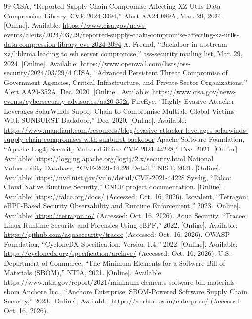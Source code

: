 \documentclass[conference]{IEEEtran}
\begin{document}
\begin{thebibliography}{99}
 CISA, ``Reported Supply Chain Compromise Affecting XZ Utils Data Compression Library, CVE-2024-3094,'' Alert AA24-089A, Mar. 29, 2024. [Online]. Available: \url{https://www.cisa.gov/news-events/alerts/2024/03/29/reported-supply-chain-compromise-affecting-xz-utils-data-compression-library-cve-2024-3094}
 A. Freund, ``Backdoor in upstream xz/liblzma leading to ssh server compromise,'' oss-security mailing list, Mar. 29, 2024. [Online]. Available: \url{https://www.openwall.com/lists/oss-security/2024/03/29/4}
 CISA, ``Advanced Persistent Threat Compromise of Government Agencies, Critical Infrastructure, and Private Sector Organizations,'' Alert AA20-352A, Dec. 2020. [Online]. Available: \url{https://www.cisa.gov/news-events/cybersecurity-advisories/aa20-352a}
 FireEye, ``Highly Evasive Attacker Leverages SolarWinds Supply Chain to Compromise Multiple Global Victims With SUNBURST Backdoor,'' Dec. 2020. [Online]. Available: \url{https://www.mandiant.com/resources/blog/evasive-attacker-leverages-solarwinds-supply-chain-compromises-with-sunburst-backdoor}
 Apache Software Foundation, ``Apache Log4j Security Vulnerabilities: CVE-2021-44228,'' Dec. 2021. [Online]. Available: \url{https://logging.apache.org/log4j/2.x/security.html}
 National Vulnerability Database, ``CVE-2021-44228 Detail,'' NIST, 2021. [Online]. Available: \url{https://nvd.nist.gov/vuln/detail/CVE-2021-44228}
 Sysdig, ``Falco: Cloud Native Runtime Security,'' CNCF project documentation. [Online]. Available: \url{https://falco.org/docs/} (Accessed: Oct. 16, 2026).
 Isovalent, ``Tetragon: eBPF-Based Security Observability and Runtime Enforcement,'' 2023. [Online]. Available: \url{https://tetragon.io/} (Accessed: Oct. 16, 2026).
 Aqua Security, ``Tracee: Linux Runtime Security and Forensics Using eBPF,'' 2022. [Online]. Available: \url{https://github.com/aquasecurity/tracee} (Accessed: Oct. 16, 2026).
 OWASP Foundation, ``CycloneDX Specification, Version 1.4,'' 2022. [Online]. Available: \url{https://cyclonedx.org/specification/archive/} (Accessed: Oct. 16, 2026).
 U.S. Department of Commerce, ``The Minimum Elements for a Software Bill of Materials (SBOM),'' NTIA, 2021. [Online]. Available: \url{https://www.ntia.gov/report/2021/minimum-elements-software-bill-materials-sbom}
 Anchore Inc., ``Anchore Enterprise: SBOM-Powered Software Supply Chain Security,'' 2023. [Online]. Available: \url{https://anchore.com/enterprise/} (Accessed: Oct. 16, 2026).

\end{thebibliography}
\end{document}
